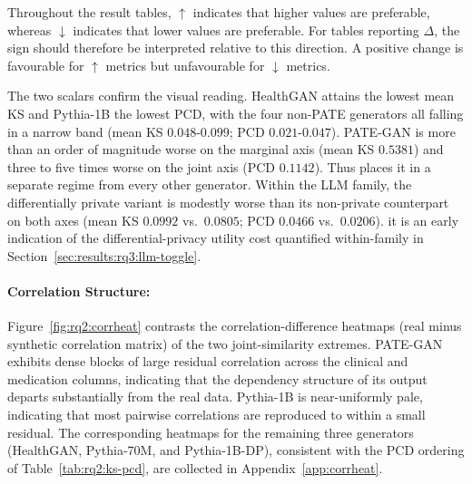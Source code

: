 Throughout the result tables, $\uparrow$ indicates that higher values are
preferable, whereas $\downarrow$ indicates that lower values are preferable.
For tables reporting $\Delta$, the sign should therefore be interpreted
relative to this direction. A positive change is favourable for $\uparrow$
metrics but unfavourable for $\downarrow$ metrics.

\begin{table}[!htbp]
\centering
\small
\caption{Mean Kolmogorov-Smirnov statistic and mean pairwise correlation
difference per generator (lower is better on both). KS is averaged over
all compared columns, PCD is the mean absolute difference between the real
and synthetic correlation matrices. The best non-trivial value in each
column is shown in bold.}
\label{tab:rq2:ks-pcd}

\end{table}

The two scalars confirm the visual reading. HealthGAN attains the lowest
mean KS and Pythia-1B the lowest PCD, with the four non-PATE generators all falling
in a narrow band (mean KS $0.048$-$0.099$; PCD $0.021$-$0.047$).
PATE-GAN is more than an order of magnitude worse on the marginal axis
(mean KS $0.5381$) and three to five times worse on the joint axis
(PCD $0.1142$). Thus places it in a separate regime from every other
generator. Within the LLM family, the differentially private variant is
modestly worse than its non-private counterpart on both axes (mean KS
$0.0992$ vs.\ $0.0805$; PCD $0.0466$ vs.\ $0.0206$). it is an early indication
of the differential-privacy utility cost quantified within-family in
Section~\ref{sec:results:rq3:llm-toggle}.

\paragraph{Correlation Structure:}
Figure~\ref{fig:rq2:corrheat} contrasts the correlation-difference
heatmaps (real minus synthetic correlation matrix) of the two
joint-similarity extremes. PATE-GAN exhibits dense blocks of large
residual correlation across the clinical and medication columns,
indicating that the dependency structure of its output departs
substantially from the real data. Pythia-1B is near-uniformly pale,
indicating that most pairwise correlations are reproduced to within a
small residual. The corresponding heatmaps for the remaining three
generators (HealthGAN, Pythia-70M, and Pythia-1B-DP), consistent with
the PCD ordering of Table~\ref{tab:rq2:ks-pcd}, are collected in
Appendix~\ref{app:corrheat}.

